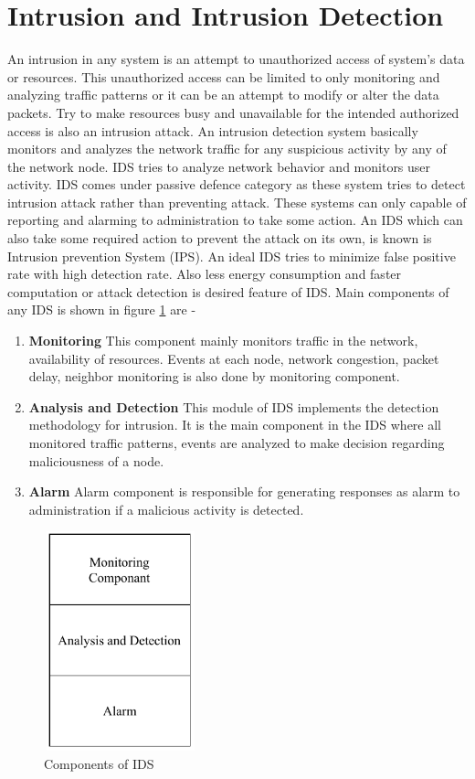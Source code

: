 \section{Intrusion and Intrusion Detection}
An intrusion in any system is an attempt to unauthorized access of system's data or resources. This unauthorized access can be limited to only monitoring and analyzing traffic patterns or it can be an attempt to modify or alter the data packets. Try to make resources busy and unavailable for the intended authorized access is also an intrusion attack. An intrusion detection system basically monitors and analyzes the network traffic for any suspicious activity by any of the network node. IDS tries to analyze network behavior and monitors user activity. IDS comes under passive defence category as these system tries to detect intrusion attack rather than preventing attack. These systems can only capable of reporting and alarming to administration to take some action. An IDS which can also take some required action to prevent the attack on its own, is known is Intrusion prevention System (IPS). An ideal IDS tries to minimize false positive rate with high detection rate. Also less energy consumption and faster computation or attack detection is desired feature of IDS. Main components of any IDS is shown in figure \ref{IDS-Component} \cite{alrajeh2013intrusion} are -
\begin{enumerate}[label=\textbf{\roman*}]
\item \textbf{Monitoring} This component mainly monitors traffic in the network, availability of resources. Events at each node, network congestion, packet delay, neighbor monitoring is also done by monitoring component.
\item \textbf{Analysis and Detection} This module of IDS implements the detection methodology for intrusion. It is the main component in the IDS where all monitored traffic patterns, events are analyzed to make decision regarding maliciousness of a node.
\item \textbf{Alarm} Alarm component is responsible for generating responses as alarm to administration if a malicious activity is detected.
\end{enumerate}
\begin{figure}[h]
\center	
\includegraphics[width=1.75in, height=2.5in] {Figures/PDF/IDS-Components.pdf}
\caption{Components of IDS}
\label{IDS-Component}	
\end{figure}
\par
